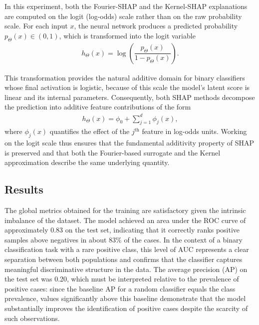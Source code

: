 \documentclass[letterpaper,11pt]{article}
\numberwithin{equation}{section}
\numberwithin{equation}{section}
\begin{document}
In this experiment, both the Fourier-SHAP and the Kernel-SHAP explanations are computed on the logit (log-odds) scale rather than on the raw probability scale. For each input $x$, the neural network produces a predicted probability $p_{\Theta}(x)\in (0,1)$, which is transformed into the logit variable
\begin{align*}
    h_\Theta(x)=\log \left(\dfrac{p_\Theta(x)}{1-p_\Theta(x)} \right). 
\end{align*}

This transformation provides the natural additive domain for binary classifiers whose final activation is logistic, because of this scale the model's latent score is linear and its internal parameters. Consequently, both SHAP methods decompose the prediction into additive feature contributions of the form
\begin{align*}
    h_\Theta(x)=\phi_0 + \sum_{j=1}^d \phi_j(x),
\end{align*}
where $\phi_j(x)$ quantifies the effect of the $j^{\text{th}}$ feature in log-odds units. Working on the logit scale thus ensures that the fundamental additivity property of SHAP is preserved and that both the Fourier-based surrogate and the Kernel approximation describe the same underlying quantity.


\subsection{Results}

The global metrics obtained for the training are satisfactory given the intrinsic imbalance of the dataset. The model achieved an area under the ROC curve of approximately 0.83 on the test set, indicating that it correctly ranks positive samples above negatives in about $83\%$ of the cases. In the context of a binary classification task with a rare positive class, this level of AUC represents a clear separation between both populations and confirms that the classifier captures meaningful discriminative structure in the data. The average precision (AP) on the test set was 0.20, which must be interpreted relative to the prevalence of positive cases: since the baseline AP for a random classifier equals the class prevalence, values significantly above this baseline demonstrate that the model substantially improves the identification of positive cases despite the scarcity of such observations.
\end{document}
